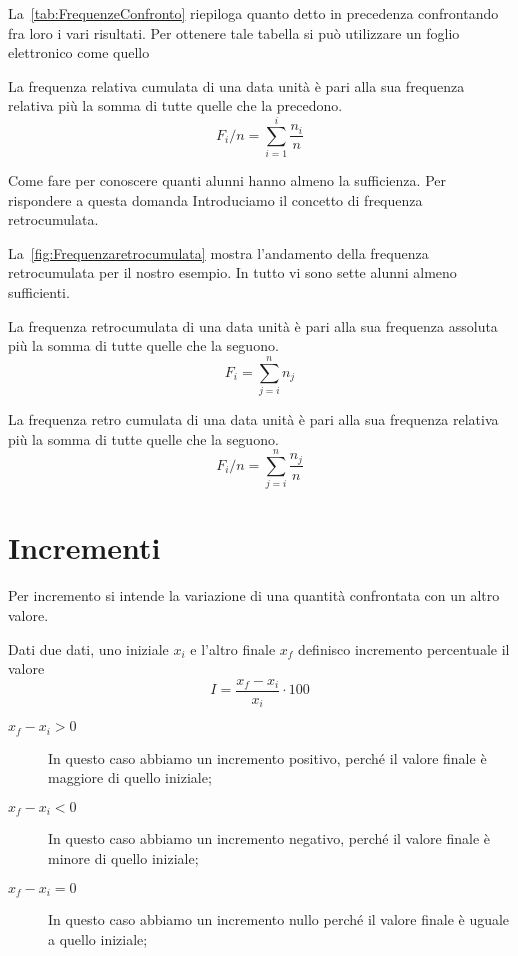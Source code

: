 La~\vref{tab:FrequenzeConfronto} riepiloga quanto detto in precedenza confrontando fra loro i vari risultati. Per ottenere tale tabella si può utilizzare un foglio elettronico come quello~
\begin{defn}
	La frequenza relativa cumulata  di una data unità è pari alla sua frequenza relativa più la somma di tutte quelle che la  precedono.
	\[F_{i}/n=\sum_{i=1}^{i}\dfrac{n_{i}}{n}\]
\end{defn}
Come fare per conoscere quanti alunni hanno almeno la sufficienza. Per rispondere a questa domanda Introduciamo il concetto di frequenza retrocumulata.\par  La~\vref{fig:Frequenzaretrocumulata} mostra l'andamento della frequenza retrocumulata per il nostro esempio. In tutto vi sono sette alunni almeno sufficienti.
\begin{defn}
	La frequenza retrocumulata di una data unità è pari alla sua frequenza assoluta più la somma di tutte quelle che la seguono.\[F_{i}=\sum_{j=i}^{n}n_{j}\]
\end{defn}

\begin{defn}
	La frequenza retro cumulata di una data unità è pari alla sua frequenza relativa più la somma di tutte quelle che la  seguono.	\[F_{i}/n=\sum_{j=i}^{n}\dfrac{n_{j}}{n}\]
\end{defn}
 \section{Incrementi }
 Per incremento si intende la variazione di una quantità confrontata con un altro valore.
 \begin{defn}
 	Dati due dati, uno iniziale $x_i$ e l'altro finale $x_f$ definisco incremento percentuale il valore  \[I=\dfrac{x_f-x_i}{x_i}\cdot 100\]
 \end{defn} 
 \begin{commento}[Confronti]
 	\begin{description}
 		\item[$x_f-x_i>0$] In questo caso abbiamo un incremento positivo, perché il valore finale è maggiore di quello iniziale;
 		\item[$x_f-x_i<0$] In questo caso abbiamo un incremento negativo, perché il valore finale è minore di quello  iniziale;
 		\item[$x_f-x_i=0$] In questo caso abbiamo un incremento nullo perché il valore finale è uguale a quello  iniziale;
 	\end{description}
 \end{commento}